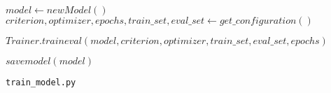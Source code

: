 \begin{algorithm}[htp]
    \footnotesize
    \SetAlgoLined

    \BlankLine
    \BlankLine
    \BlankLine

    $model \gets new Model()$\\
    $criterion, optimizer, epochs, train\_set, eval\_set \gets get\_configuration()$\BlankLine\BlankLine

    $Trainer.traineval(model, criterion, optimizer, train\_set, eval\_set, epochs)$\BlankLine\BlankLine

    $savemodel(model)$

    \caption{\texttt{train\_model.py}}
    \label{alg:trainmodel}
\end{algorithm}